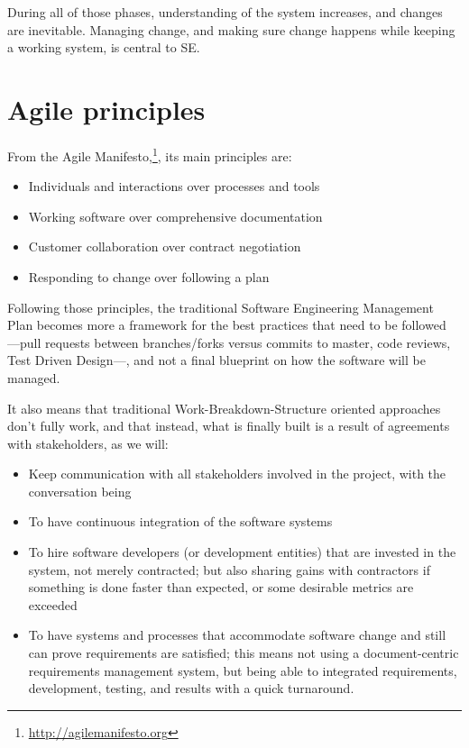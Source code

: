 \documentclass[11pt,twoside]{article}
\begin{document}
During all of those phases, understanding of the system increases, and changes are inevitable. Managing change, and making sure change happens while keeping a working system, is central to SE.

\section{Agile principles} %
\label{sec:agile_principles}

From the Agile Manifesto,\footnote{\url{http://agilemanifesto.org}}, its main principles are:

\begin{itemize}
	\item Individuals and interactions over processes and tools
	\item Working software over comprehensive documentation
	\item Customer collaboration over contract negotiation
	\item Responding to change over following a plan	
\end{itemize}

Following those principles, the traditional Software Engineering Management Plan becomes more a framework for the best practices that need to be followed —pull requests between branches/forks versus commits to master, code reviews, Test Driven Design—, and not a final blueprint on how the software will be managed.

It also means that traditional Work-Breakdown-Structure oriented approaches don’t fully work, and that instead, what is finally built is a result of agreements with stakeholders, as we will:
\begin{itemize}
	\item Keep communication with all stakeholders involved in the project, with the conversation being 	
	\item To have continuous integration of the software systems	
	\item To hire software developers (or development entities) that are invested in the system, not merely contracted; but also sharing gains with contractors if something is done faster than expected, or some desirable metrics are exceeded	
	\item To have systems and processes that accommodate software change and still can prove requirements are satisfied; this means not using a document-centric requirements management system, but being able to integrated requirements, development, testing, and results with a quick turnaround.	
\end{itemize}
\end{document}
